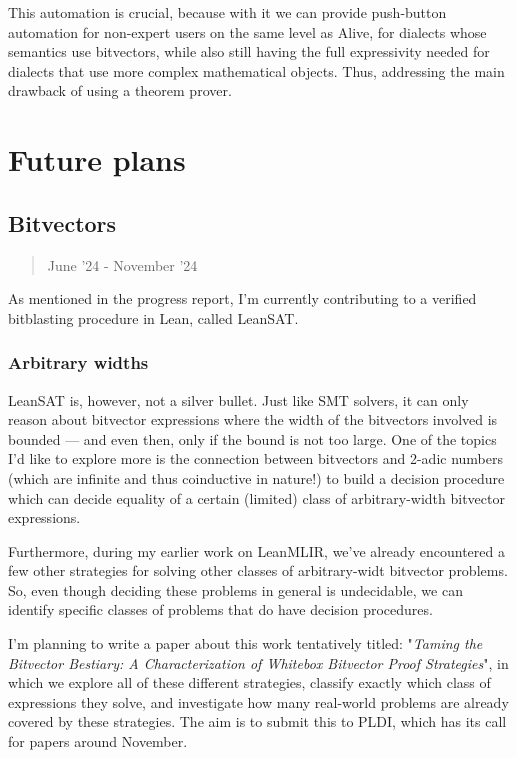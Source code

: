 \documentclass[a4paper]{scrartcl}
\begin{document}
This automation is crucial, because with it we can provide push-button
automation for non-expert users on the same level as Alive, for dialects
whose semantics use bitvectors, while also still having the full
expressivity needed for dialects that use more complex mathematical
objects. Thus, addressing the main drawback of using a theorem prover.


\section{Future plans}\label{future-plans}


\subsection{Bitvectors}\label{bitvectors-1}

\begin{quote}
June '24 - November '24
\end{quote}

As mentioned in the progress report, I'm currently contributing to a
verified bitblasting procedure in Lean, called LeanSAT.


\subsubsection{Arbitrary widths}\label{arbitrary-widths}

LeanSAT is, however, not a silver bullet. Just like SMT solvers, it can
only reason about bitvector expressions where the width of the
bitvectors involved is bounded --- and even then, only if the bound is not too large.
One of the topics I'd like to explore more is the connection between bitvectors and 2-adic numbers (which are
infinite and thus coinductive in nature!) to build a decision procedure
which can decide equality of a certain (limited) class of
arbitrary-width bitvector expressions.

Furthermore, during my earlier work on LeanMLIR, we've already encountered a 
few other strategies for solving other classes of arbitrary-widt bitvector problems.
So, even though deciding these problems in general is undecidable, we can identify
specific classes of problems that do have decision procedures.

I'm planning to write a paper about this work tentatively titled: "\emph{Taming the Bitvector Bestiary: A Characterization of Whitebox Bitvector Proof Strategies}", 
in which we explore all of these different strategies, 
classify exactly which class of expressions they solve, 
and investigate how many real-world problems are already covered by these strategies.
The aim is to submit this to PLDI, which has its call for papers around November.
\end{document}
